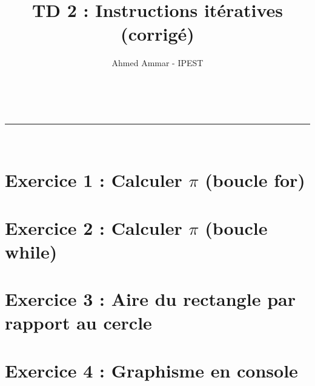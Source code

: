 \documentclass[a4paper,11pt]{article}
\author{Ahmed Ammar - IPEST}
\makeatletter
\newcommand{\linia}{\rule{\linewidth}{0.5pt}}
\theoremstyle{mytheor}
\renewcommand{\maketitle}{
\begin{center}
\vspace{2ex}
{\huge \textsc{\@title}}
\vspace{1ex}
\\
\linia\\
\@author \hfill \@date
\vspace{4ex}
\end{center}
}
\makeatother
\begin{document}
\title{TD 2 : Instructions itératives (corrigé)}

\maketitle


\section*{Exercice 1 : Calculer $\pi$ (boucle for)}

\section*{Exercice 2 : Calculer $\pi$ (boucle while)}



\section*{Exercice 3 : Aire du rectangle par rapport au cercle}

\section*{Exercice 4 : Graphisme en console}

\end{document}
